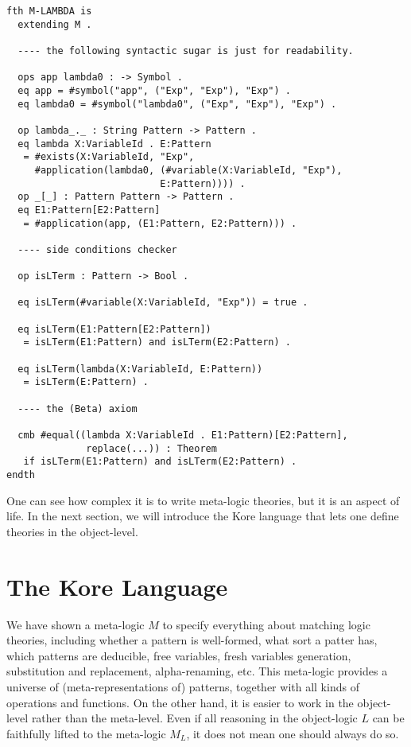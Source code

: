 \documentclass[UTF8]{article}
\theoremstyle{plain}
\theoremstyle{definition}
\theoremstyle{remark}
\begin{document}
\begin{Verbatim}[fontsize=\small]
fth M-LAMBDA is
  extending M .
  
  ---- the following syntactic sugar is just for readability. 

  ops app lambda0 : -> Symbol .
  eq app = #symbol("app", ("Exp", "Exp"), "Exp") .
  eq lambda0 = #symbol("lambda0", ("Exp", "Exp"), "Exp") .
  
  op lambda_._ : String Pattern -> Pattern .
  eq lambda X:VariableId . E:Pattern
   = #exists(X:VariableId, "Exp", 
     #application(lambda0, (#variable(X:VariableId, "Exp"), 
                           E:Pattern)))) .
  op _[_] : Pattern Pattern -> Pattern .
  eq E1:Pattern[E2:Pattern] 
   = #application(app, (E1:Pattern, E2:Pattern))) .
   
  ---- side conditions checker
  
  op isLTerm : Pattern -> Bool .

  eq isLTerm(#variable(X:VariableId, "Exp")) = true .
  
  eq isLTerm(E1:Pattern[E2:Pattern])
   = isLTerm(E1:Pattern) and isLTerm(E2:Pattern) .
   
  eq isLTerm(lambda(X:VariableId, E:Pattern))
   = isLTerm(E:Pattern) .
  
  ---- the (Beta) axiom

  cmb #equal((lambda X:VariableId . E1:Pattern)[E2:Pattern],
              replace(...)) : Theorem
   if isLTerm(E1:Pattern) and isLTerm(E2:Pattern) .
endth
\end{Verbatim}

One can see how complex it is to write meta-logic theories, but it is an aspect 
of life. 
In the next section, we will introduce the Kore language that lets one define 
theories in the object-level. 

\section{The Kore Language}

We have shown a meta-logic $M$ to specify everything about 
matching logic theories, including whether a pattern is well-formed, what sort 
a patter has, which patterns are deducible, free variables, fresh variables 
generation, substitution and replacement, alpha-renaming, etc. 
This meta-logic provides a universe of (meta-representations of) patterns, 
together with all kinds of operations and functions. 
On the other hand, it is easier to work in the object-level rather than the 
meta-level. 
Even if all reasoning in the object-logic $L$ can be faithfully lifted to the 
meta-logic $M_L$, it does not mean one should always do so. 
\end{document}
